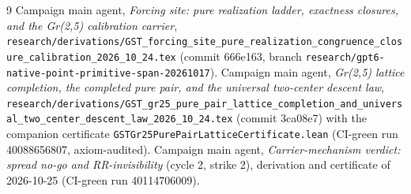 \documentclass[11pt]{article}
\begin{document}
\begin{thebibliography}{9}
Campaign main agent, \emph{Forcing site: pure realization ladder, exactness
closures, and the Gr(2,5) calibration carrier},
\texttt{research/derivations/GST\_forcing\_site\_pure\_realization\_congruence\_closure\_calibration\_2026\_10\_24.tex}
(commit 666e163, branch \texttt{research/gpt6-native-point-primitive-span-20261017}).
Campaign main agent, \emph{Gr(2,5) lattice completion, the completed pure
pair, and the universal two-center descent law},
\texttt{research/derivations/GST\_gr25\_pure\_pair\_lattice\_completion\_and\_universal\_two\_center\_descent\_law\_2026\_10\_24.tex}
(commit 3ca08e7) with the companion certificate
\texttt{GSTGr25PurePairLatticeCertificate.lean} (CI-green run 40088656807,
axiom-audited).
Campaign main agent, \emph{Carrier-mechanism verdict: spread no-go and
RR-invisibility} (cycle 2, strike 2), derivation and certificate of
2026-10-25 (CI-green run 40114706009).
\end{thebibliography}
\end{document}
